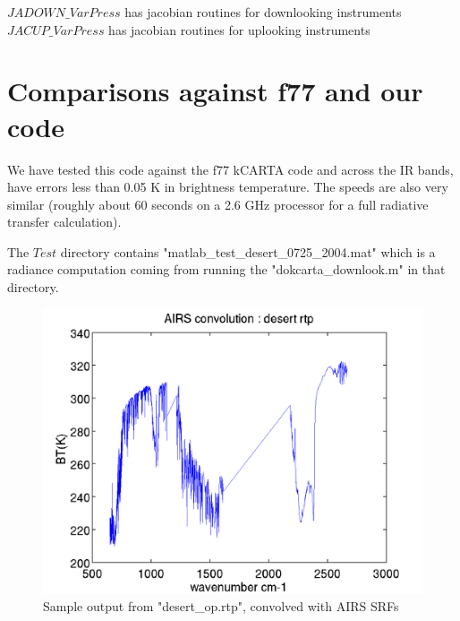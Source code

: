 \documentclass[12pt]{article}
\newcommand{\kc}{\textsf{kCARTA}\xspace}
\begin{document}
\noindent $JADOWN\_VarPress$ has jacobian routines for downlooking 
instruments\\

\noindent $JACUP\_VarPress$ has jacobian routines for uplooking instruments\\

\section{Comparisons against f77 and our code}
We have tested this code against the f77 \kc code and across the IR bands, 
have errors less than 0.05 K in brightness temperature. The speeds are also
very similar (roughly about 60 seconds on a 2.6 GHz processor for a full
radiative transfer calculation).

The $Test$ directory contains "matlab\_test\_desert\_0725\_2004.mat" which is 
a radiance computation coming from running the "dokcarta\_downlook.m" in that
directory.

\begin{figure}
\includegraphics[width=5.5in]{desert_rtp.png}
\caption{Sample output from "desert\_op.rtp", convolved with AIRS SRFs}
\label{translatingfiles}
\end{figure}
\end{document}
